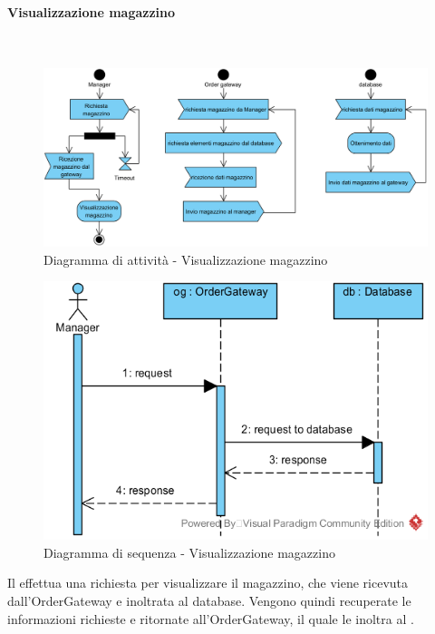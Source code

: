 \begin{samepage}
\paragraph{Visualizzazione magazzino}\mbox{}\\
\begin{figure}[H]
	\centering
	\includegraphics[width=14cm]{diagrammi_img/attivita/manager_mag.png}
	\caption{Diagramma di attività - Visualizzazione magazzino}
\end{figure}
\end{samepage}
\begin{figure}[H]
	\centering
	\includegraphics[width=14cm]{../../documenti/SpecificaTecnica/diagrammi_img/sequenza/direttore_visualizza_magazzino.png}
	\caption{Diagramma di sequenza - Visualizzazione magazzino}
\end{figure}
Il \Manager{} effettua una richiesta per visualizzare il magazzino, che viene ricevuta dall'Order\-Gateway e inoltrata al database. Vengono quindi recuperate le informazioni richieste e ritornate all'Order\-Gateway, il quale le inoltra al \Manager{}.

